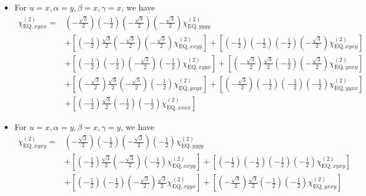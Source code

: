 \documentclass[UTF8,10pt,a4paper]{article}
\begin{document}
\begin{itemize}
\item For $u=x,\alpha=y,\beta=x,\gamma=x$, we have
\footnotesize\begin{align}
\nonumber\chi_{\text{EQ},xyxx}^{(2)}=&\left(-\frac{\sqrt{3}}{2}\right)\left(-\frac{1}{2}\right)\left(-\frac{\sqrt{3}}{2}\right)\left(-\frac{\sqrt{3}}{2}\right)\chi_{\text{EQ},yyyy}^{(2)}\\
\nonumber&+\left[\left(-\frac{1}{2}\right)\frac{\sqrt{3}}{2}\left(-\frac{\sqrt{3}}{2}\right)\left(-\frac{\sqrt{3}}{2}\right)\chi_{\text{EQ},xxyy}^{(2)}\right]+\left[\left(-\frac{1}{2}\right)\left(-\frac{1}{2}\right)\left(-\frac{1}{2}\right)\left(-\frac{\sqrt{3}}{2}\right)\chi_{\text{EQ},xyxy}^{(2)}\right]\\
\nonumber&+\left[\left(-\frac{1}{2}\right)\left(-\frac{1}{2}\right)\left(-\frac{\sqrt{3}}{2}\right)\left(-\frac{1}{2}\right)\chi_{\text{EQ},xyyx}^{(2)}\right]+\left[\left(-\frac{\sqrt{3}}{2}\right)\frac{\sqrt{3}}{2}\left(-\frac{1}{2}\right)\left(-\frac{\sqrt{3}}{2}\right)\chi_{\text{EQ},yxxy}^{(2)}\right]\\
\nonumber&+\left[\left(-\frac{\sqrt{3}}{2}\right)\frac{\sqrt{3}}{2}\left(-\frac{\sqrt{3}}{2}\right)\left(-\frac{1}{2}\right)\chi_{\text{EQ},yxyx}^{(2)}\right]+\left[\left(-\frac{\sqrt{3}}{2}\right)\left(-\frac{1}{2}\right)\left(-\frac{1}{2}\right)\left(-\frac{1}{2}\right)\chi_{\text{EQ},yyxx}^{(2)}\right]\\
&+\left[\left(-\frac{1}{2}\right)\frac{\sqrt{3}}{2}\left(-\frac{1}{2}\right)\left(-\frac{1}{2}\right)\chi_{\text{EQ},xxxx}^{(2)}\right]
\end{align}\normalsize
\item For $u=x,\alpha=y,\beta=x,\gamma=y$, we have
\footnotesize\begin{align}
\nonumber\chi_{\text{EQ},xyxy}^{(2)}=&\left(-\frac{\sqrt{3}}{2}\right)\left(-\frac{1}{2}\right)\left(-\frac{\sqrt{3}}{2}\right)\left(-\frac{1}{2}\right)\chi_{\text{EQ},yyyy}^{(2)}\\
\nonumber&+\left[\left(-\frac{1}{2}\right)\frac{\sqrt{3}}{2}\left(-\frac{\sqrt{3}}{2}\right)\left(-\frac{1}{2}\right)\chi_{\text{EQ},xxyy}^{(2)}\right]+\left[\left(-\frac{1}{2}\right)\left(-\frac{1}{2}\right)\left(-\frac{1}{2}\right)\left(-\frac{1}{2}\right)\chi_{\text{EQ},xyxy}^{(2)}\right]\\
\nonumber&+\left[\left(-\frac{1}{2}\right)\left(-\frac{1}{2}\right)\left(-\frac{\sqrt{3}}{2}\right)\frac{\sqrt{3}}{2}\chi_{\text{EQ},xyyx}^{(2)}\right]+\left[\left(-\frac{\sqrt{3}}{2}\right)\frac{\sqrt{3}}{2}\left(-\frac{1}{2}\right)\left(-\frac{1}{2}\right)\chi_{\text{EQ},yxxy}^{(2)}\right]\\

\end{align}
\end{itemize}
\end{document}
